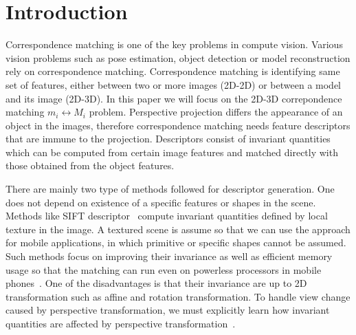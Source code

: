 \documentclass{bmvc2k}
\begin{document}
\section{Introduction}
\label{sec:intro}
Correspondence matching is one of the key problems in compute vision. Various vision problems such as pose estimation, object detection or model reconstruction rely on correspondence matching. 
Correspondence matching is identifying same set of features, either between two or more images (2D-2D) or between a model and its image (2D-3D). In this paper we will focus on the 2D-3D correpondence matching $ m_i \leftrightarrow M_i $ problem. 
Perspective projection differs the appearance of an object in the images, therefore correspondence matching needs feature descriptors that are immune to the projection. Descriptors consist of invariant quantities which can be computed from certain image features and matched directly with those obtained from the object features. 

There are mainly two type of methods followed for descriptor generation. One does not depend on existence of a specific features or shapes in the scene. 
Methods like SIFT descriptor~\cite{Lowe1999} compute invariant quantities defined by local texture in the image.
A textured scene is assume so that we can use the approach for mobile applications, in which primitive or specific shapes cannot be assumed.
Such methods focus on improving their invariance as well as efficient memory usage so that the matching can run even on powerless processors in mobile phones~\cite{Ke2004,Calonder2010}.
One of the disadvantages is that their invariance are up to 2D transformation such as affine and rotation transformation.
To handle view change caused by perspective transformation, we must explicitly learn how invariant quantities are affected by perspective transformation~\cite{Kurz2012,Lepetit2006}. 
\end{document}

